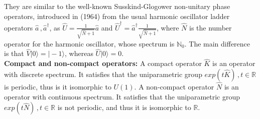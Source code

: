 \documentclass[12pt]{iopart}
\begin{document}
They are similar to the well-known Susskind-Glogower non-unitary phase operators, introduced in (1964) from the usual harmonic oscillator ladder operators $\hat{a}\,,\hat{a}^\dag$, as $\hat{U}=\frac{1}{\sqrt{\hat{N}+1}}\hat{a}$ and $\hat{U}^\dag=\hat{a}^\dag\frac{1}{\sqrt{\hat{N}+1}}$, where $\hat{N}$ is the number operator for the harmonic oscillator, whose
spectrum is $\mathbb{N}_0$. The main difference is that $\hat{V}|0\rangle=|-1\rangle$, whereas $\hat{U}|0\rangle=0$.
\\
\textbf{Compact and non-compact operators:} A compact operator $\hat{K}$ is an operator with discrete spectrum. It satisfies
that the uniparametric group $exp(t\hat{K})\,,t\in\mathbb{R}$ is periodic, thus is it isomorphic to $U(1)$. A non-compact operator $\hat{N}$
is an operator with continuous spectrum. It satisfies that the uniparametric group $exp(t\hat{N})\,,t\in\mathbb{R}$ is not periodic, 
and thus it is isomorphic to $\mathbb{R}$.
\end{document}
